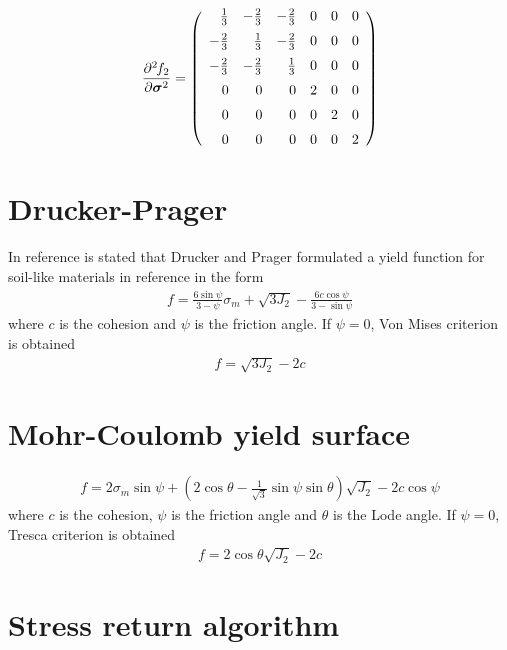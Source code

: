 \begin{eqnarray}
\mbox{$\displaystyle\frac{\partial^{2}\>\!\!{f_2}}{\partial{\mbox{\boldmath$\sigma$}}^{2}}$} = \left(\begin{array}{rrrrrr}
 \frac{1}{3} & -\frac{2}{3} & -\frac{2}{3} & 0 & 0 & 0
\\[2mm]
-\frac{2}{3} &  \frac{1}{3} & -\frac{2}{3} & 0 & 0 & 0
\\[2mm]
-\frac{2}{3} & -\frac{2}{3} &  \frac{1}{3} & 0 & 0 & 0
\\[2mm]
          0  &           0  &           0  & 2 & 0 & 0
\\[2mm]
          0  &           0  &           0  & 0 & 2 & 0
\\[2mm]
          0  &           0  &           0  & 0 & 0 & 2
\end{array}\right)
\end{eqnarray}

\section{Drucker-Prager}
In reference \cite{zienkiewicz:viscoplasticity} is stated that
Drucker and Prager formulated a yield function for soil-like materials
in reference \cite{drucker:druckerprager} in the form
\begin{eqnarray}
f = \frac{6 \sin \psi}{3 - \psi} \sigma_m + \sqrt{3 J_2} - \frac{6 c \cos \psi}{3 - \sin \psi} 
\end{eqnarray}
where $c$ is the cohesion and $\psi$ is the friction angle.
If $\psi=0$, Von Mises criterion is obtained
\begin{eqnarray}
f = \sqrt{3 J_2} - 2 c
\end{eqnarray}

\section{Mohr-Coulomb yield surface}
\begin{eqnarray}
f = 2 \sigma_m \sin \psi + \left(2 \cos \theta - \frac{1}{\sqrt{3}} \sin \psi \sin \theta\right) \sqrt{J_2} - 2 c \cos \psi
\end{eqnarray}
where $c$ is the cohesion, $\psi$ is the friction angle and $\theta$ is the Lode angle.
If $\psi=0$, Tresca criterion is obtained
\begin{eqnarray}
f = 2 \cos \theta \sqrt{J_2} - 2 c
\end{eqnarray}


\section{Stress return algorithm}

